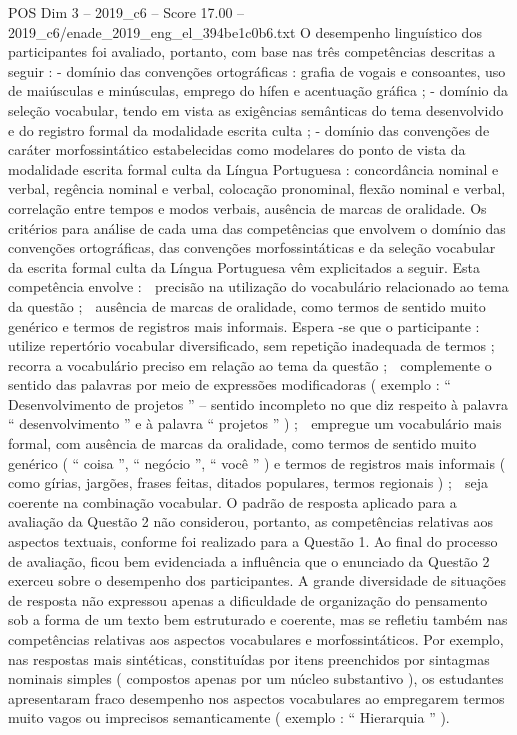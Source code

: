 \begin{textsample}{POS Dim 3 – 2019\_c6 – Score 17.00 – 2019\_c6/enade\_2019\_eng\_el\_394be1c0b6.txt}
O desempenho linguístico dos participantes foi avaliado, portanto, com base nas três competências descritas a seguir : - domínio das convenções ortográficas : grafia de vogais e consoantes, uso de maiúsculas e minúsculas, emprego do hífen e acentuação gráfica ; - domínio da seleção vocabular, tendo em vista as exigências semânticas do tema desenvolvido e do registro formal da modalidade escrita culta ; - domínio das convenções de caráter morfossintático estabelecidas como modelares do ponto de vista da modalidade escrita formal culta da Língua Portuguesa : concordância nominal e verbal, regência nominal e verbal, colocação pronominal, flexão nominal e verbal, correlação entre tempos e modos verbais, ausência de marcas de oralidade.
Os critérios para análise de cada uma das competências que envolvem o domínio das convenções ortográficas, das convenções morfossintáticas e da seleção vocabular da escrita formal culta da Língua Portuguesa vêm explicitados a seguir.
Esta competência envolve :  precisão na utilização do vocabulário relacionado ao tema da questão ;  ausência de marcas de oralidade, como termos de sentido muito genérico e termos de registros mais informais.
Espera -se que o participante :  utilize repertório vocabular diversificado, sem repetição inadequada de termos ;  recorra a vocabulário preciso em relação ao tema da questão ;  complemente o sentido das palavras por meio de expressões modificadoras ( exemplo : “ Desenvolvimento de projetos ” – sentido incompleto no que diz respeito à palavra “ desenvolvimento ” e à palavra “ projetos ” ) ;  empregue um vocabulário mais formal, com ausência de marcas da oralidade, como termos de sentido muito genérico ( “ coisa ”, “ negócio ”, “ você ” ) e termos de registros mais informais ( como gírias, jargões, frases feitas, ditados populares, termos regionais ) ;  seja coerente na combinação vocabular.
O padrão de resposta aplicado para a avaliação da Questão 2 não considerou, portanto, as competências relativas aos aspectos textuais, conforme foi realizado para a Questão 1.
Ao final do processo de avaliação, ficou bem evidenciada a influência que o enunciado da Questão 2 exerceu sobre o desempenho dos participantes.
A grande diversidade de situações de resposta não expressou apenas a dificuldade de organização do pensamento sob a forma de um texto bem estruturado e coerente, mas se refletiu também nas competências relativas aos aspectos vocabulares e morfossintáticos.
Por exemplo, nas respostas mais sintéticas, constituídas por itens preenchidos por sintagmas nominais simples ( compostos apenas por um núcleo substantivo ), os estudantes apresentaram fraco desempenho nos aspectos vocabulares ao empregarem termos muito vagos ou imprecisos semanticamente ( exemplo : “ Hierarquia ” ).

\end{textsample}
